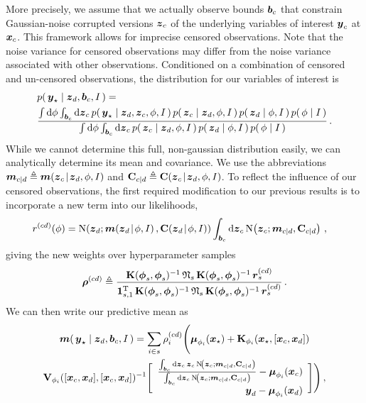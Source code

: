 \documentclass{acmtrans2m}
\begin{document}
More precisely, we assume that we actually observe bounds $\boldsymbol{b}_c$ that constrain Gaussian-noise corrupted versions $\boldsymbol{z}_c$ of the underlying variables of interest $\boldsymbol{y}_c$ at $\boldsymbol{x}_c$. This framework allows for imprecise censored observations. Note that the noise variance for censored observations may differ from the noise variance associated with other observations. Conditioned on a combination of censored and un-censored observations, the distribution for our variables of interest is
\begin{align} \label{eq:CensoredFull}
& \p{\vyst}{\vzD,\vect{b}_c,I}=\nonumber\\
& \frac{\int\ud\phi\int_{\vect{b}_c}\ud\vz_c\, \p{\vyst}{\vzD,\vz_c,\phi,I}\p{\vz_c}{\vzD,\phi,I}\p{\vzD}{\phi,I}\p{\phi}{I}}
{\int\ud\phi\int_{\vect{b}_c}\ud\vz_c\, \p{\vz_c}{\vzD,\phi,I}\p{\vzD}{\phi,I}\p{\phi}{I}}\,.
\end{align}
While we cannot determine this full, non-gaussian distribution easily, we can analytically determine its mean and covariance. We use the abbreviations $\boldsymbol{m}_{c|d}\triangleq\boldsymbol{m}\!\left(\boldsymbol{z}_c\!\mid\!\boldsymbol{z}_d,\phi,I\right)$ and $\mathbf{C}_{c|d}\triangleq\mathbf{C}\!\left(\boldsymbol{z}_c\!\mid\!\boldsymbol{z}_d,\phi,I\right)$.
To reflect the influence of our censored observations, the first required modification to our previous results is to incorporate a new term into our likelihoods, 
\begin{align}
 r^{(cd)}(\phi) %
  &= \N{\vzD}{\meanskinny{\vzD}{\phi,I}}{\covskinny{\vzD}{\phi,I}}\int_{\vect{b}_c}\ud\vz_c\,\N{\vz_c}{\vect{m}_{c|d}}{\mat{C}_{c|d}}\,,
\end{align}
giving the new weights over hyperparameter samples
\begin{equation}
\boldsymbol{\rho}^{(cd)}\triangleq\frac{\mathbf{K}(\boldsymbol{\phi}_s,\boldsymbol{\phi}_s)^{-1}\,\mathbf{\mathfrak{N}}_s\,\mathbf{K}(\boldsymbol{\phi}_s,\boldsymbol{\phi}_s)^{-1}\,\boldsymbol{r}^{(cd)}_s}
{\mathbf{1}_{s,1}^{\mathrm{T}}\,\mathbf{K}(\boldsymbol{\phi}_s,\boldsymbol{\phi}_s)^{-1}\,\mathbf{\mathfrak{N}}_s\,\mathbf{K}(\boldsymbol{\phi}_s,\boldsymbol{\phi}_s)^{-1}\,\boldsymbol{r}^{(cd)}_s}\,.
\end{equation}
We can then write our predictive mean as
\begin{multline} \label{eq:CensoredMean}
\boldsymbol{m}\!\left(\,\boldsymbol{y}_\star\mid\boldsymbol{z}_d,\boldsymbol{b}_c,I\,\right)=\sum_{i\in s}\rho^{(cd)}_i\Biggl(\boldsymbol{\mu}_{\phi_i}(\boldsymbol{x}_\star)+\mathbf{K}_{\phi_i}(\boldsymbol{x}_\star,[\boldsymbol{x}_c,\boldsymbol{x}_d])\\\mathbf{V}_{\phi_i}([\boldsymbol{x}_c,\boldsymbol{x}_d],[\boldsymbol{x}_c,\boldsymbol{x}_d])^{-1}
\Biggl[\begin{array}{r}
	\frac{\int_{\boldsymbol{b}_c}\mathrm{d}\boldsymbol{z}_c\,\boldsymbol{z}_c\, \text{N}\!\left(\boldsymbol{z}_c;\boldsymbol{m}_{c|d},\mathbf{C}_{c|d}\right)}{\int_{\boldsymbol{b}_c}\mathrm{d}\boldsymbol{z}_c\,\text{N}\!\left(\boldsymbol{z}_c;\boldsymbol{m}_{c|d},\mathbf{C}_{c|d}\right)}-\boldsymbol{\mu}_{\phi_i}(\boldsymbol{x}_c)\\
       \boldsymbol{y}_d-\boldsymbol{\mu}_{\phi_i}(\boldsymbol{x}_d)
      \end{array}\Biggr]\Biggr)\,,
\end{multline}
\end{document}
